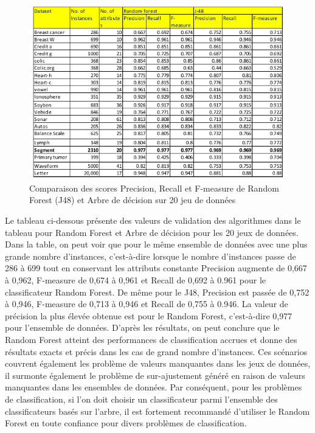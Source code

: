 \begin{figure}[h]
\begin{center}
\includegraphics[scale=0.70]{ROC_Comparaison.png} 
\caption[Comparaison des scores Precision, Recall et F-measure de Random Forest (J48) et Arbre de décision sur 20 jeu de données]{Comparaison des scores Precision, Recall et F-measure de Random Forest (J48) et Arbre de décision sur 20 jeu de données}
\label{monlabel}
\end{center}
\end{figure}
Le tableau ci-dessous  présente des valeurs de validation des algorithmes dans le tableau pour
Random Forest et Arbre de décision pour les 20 jeux de données. Dans la  table, on peut voir que pour le même ensemble de données avec une plus grande nombre d'instances, c'est-à-dire lorsque le nombre d'instances
passe de 286 à 699 tout en conservant les attributs constante Precision augmente de 0,667 à 0,962, F-measure
de 0,674 à 0,961 et Recall de 0,692 à 0.961 pour le classificateur Random Forest. De même pour le
J48, Precision est passée de 0,752 à 0,946, F-measure de 0,713 à 0,946 et Recall de 0,755 à
0.946. La valeur de précision la plus élevée obtenue est pour le Random Forest, c'est-à-dire 0,977 pour l'ensemble de données.
D'après les résultats, on peut conclure que le Random Forest atteint des performances de classification accrues et donne des résultats exacts et précis dans les cas de grand nombre d'instances. Ces scénarios couvrent également les
problème de valeurs manquantes dans les jeux de données, il surmonte également le problème de sur-ajustement
généré en raison de valeurs manquantes dans les ensembles de données. Par conséquent, pour les problèmes de classification, si l'on doit choisir un classificateur parmi l'ensemble des classificateurs basés sur l'arbre, il est fortement recommandé d'utiliser le Random Forest en toute confiance pour divers problèmes de classification.


